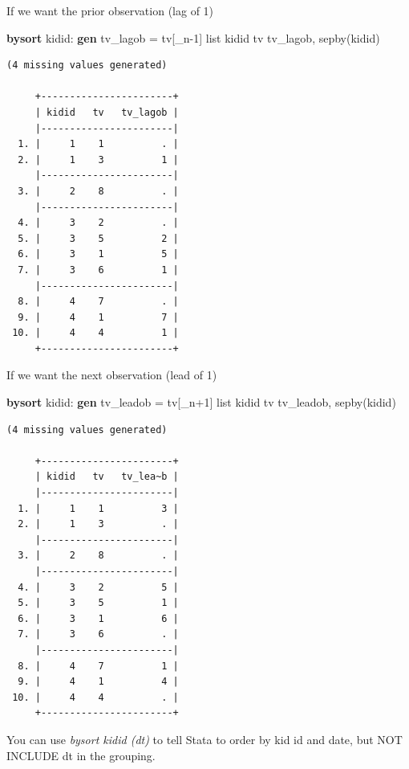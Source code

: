 \documentclass[
]{book}
\newenvironment{Shaded}{\begin{snugshade}}{\end{snugshade}}
\newcommand{\DataTypeTok}[1]{\textcolor[rgb]{0.13,0.29,0.53}{#1}}
\newcommand{\KeywordTok}[1]{\textcolor[rgb]{0.13,0.29,0.53}{\textbf{#1}}}
\newcommand{\NormalTok}[1]{#1}
\newcommand{\OtherTok}[1]{\textcolor[rgb]{0.56,0.35,0.01}{#1}}
\begin{document}
If we want the prior observation (lag of 1)

\begin{Shaded}
\begin{Highlighting}[]
\KeywordTok{bysort}\NormalTok{ kidid: }\KeywordTok{gen}\NormalTok{ tv\_lagob = tv[}\DataTypeTok{\_n}\NormalTok{{-}1]}
\OtherTok{list}\NormalTok{ kidid tv tv\_lagob, sepby(kidid)}
\end{Highlighting}
\end{Shaded}

\begin{verbatim}
(4 missing values generated)

     +-----------------------+
     | kidid   tv   tv_lagob |
     |-----------------------|
  1. |     1    1          . |
  2. |     1    3          1 |
     |-----------------------|
  3. |     2    8          . |
     |-----------------------|
  4. |     3    2          . |
  5. |     3    5          2 |
  6. |     3    1          5 |
  7. |     3    6          1 |
     |-----------------------|
  8. |     4    7          . |
  9. |     4    1          7 |
 10. |     4    4          1 |
     +-----------------------+
\end{verbatim}

If we want the next observation (lead of 1)

\begin{Shaded}
\begin{Highlighting}[]
\KeywordTok{bysort}\NormalTok{ kidid: }\KeywordTok{gen}\NormalTok{ tv\_leadob = tv[}\DataTypeTok{\_n}\NormalTok{+1]}
\OtherTok{list}\NormalTok{ kidid tv tv\_leadob, sepby(kidid)}
\end{Highlighting}
\end{Shaded}

\begin{verbatim}
(4 missing values generated)

     +-----------------------+
     | kidid   tv   tv_lea~b |
     |-----------------------|
  1. |     1    1          3 |
  2. |     1    3          . |
     |-----------------------|
  3. |     2    8          . |
     |-----------------------|
  4. |     3    2          5 |
  5. |     3    5          1 |
  6. |     3    1          6 |
  7. |     3    6          . |
     |-----------------------|
  8. |     4    7          1 |
  9. |     4    1          4 |
 10. |     4    4          . |
     +-----------------------+
\end{verbatim}

You can use \emph{bysort kidid (dt)} to tell Stata to order by kid id and date,
but NOT INCLUDE dt in the grouping.
\end{document}
